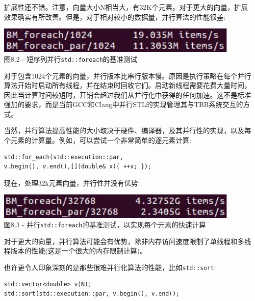 扩展性还不错。注意，向量大小N相当大，有32K个元素。对于更大的向量，扩展效果确实有所改善。但是，对于相对较小的数据量，并行算法的性能很差:

\begin{center}
\includegraphics[width=0.9\textwidth]{content/2/chapter8/images/2.jpg}\\
图8.2 - 短序列并行\texttt{std::foreach}的基准测试
\end{center}

对于包含1024个元素的向量，并行版本比串行版本慢。原因是执行策略在每个并行算法开始时启动所有线程，并在结束时回收它们。启动新线程需要花费大量时间，因此当计算时间较短时，开销会超过我们从并行化中获得的任何加速。这不是标准强加的要求，而是当前GCC和Clang中并行STL的实现管理其与TBB系统交互的方式。 

当然，并行算法提高性能的大小取决于硬件、编译器，及其并行性的实现，以及每个元素的计算量。例如，可以尝试一个非常简单的逐元素计算:

\begin{lstlisting}[style=styleCXX]
std::for_each(std::execution::par,
v.begin(), v.end(),[](double& x){ ++x; });
\end{lstlisting}

现在，处理32k元素向量，并行性并没有优势:

\begin{center}
\includegraphics[width=0.9\textwidth]{content/2/chapter8/images/3.jpg}\\
图8.3 - 并行\texttt{std::foreach}的基准测试，以实现每个元素的快速计算
\end{center}

对于更大的向量，并行算法可能会有优势，除非内存访问速度限制了单线程和多线程版本的性能(这是一个很大的内存限制计算)。

也许更令人印象深刻的是那些很难并行化算法的性能，比如\texttt{std::sort}:

\begin{lstlisting}[style=styleCXX]
std::vector<double> v(N);
std::sort(std::execution::par, v.begin(), v.end();
\end{lstlisting}

